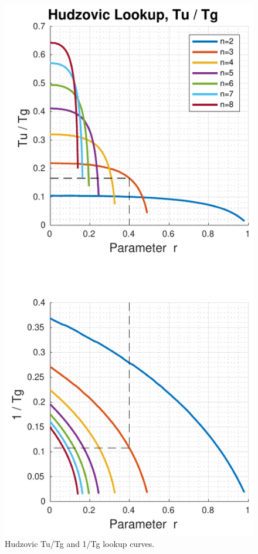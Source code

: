 \begin{figure}
    \includegraphics[width=\linewidth]{images/hudzovic_curves_tu_tg}
    \caption{Hudzovic Tu/Tg and 1/Tg lookup curves.}
    \label{fig:hudzovic_tu_tg}
\end{figure}
